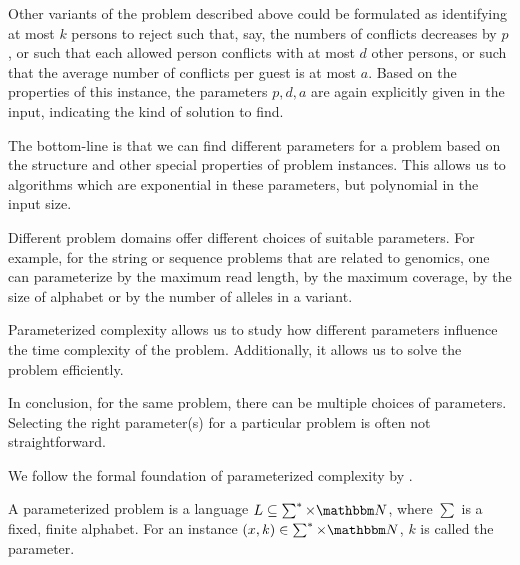 Other variants of the problem described above could be formulated as identifying at most $k$ persons to reject such that,
say, the numbers of conflicts decreases by $p$, or such that each allowed person conflicts with at most $d$ other persons,
or such that the average number of conflicts per guest is at most $a$. Based on the properties of this instance, the parameters $p, d, a$ are again explicitly given in the input,
indicating the kind of solution to find. 

The bottom-line is that we can find different parameters for a problem based on the structure and other special properties of problem instances.
This allows us to algorithms which are exponential in these parameters, but polynomial in the input size.

Different problem domains offer different choices of suitable parameters. For example, 
for the string or sequence problems that are related to genomics, one can parameterize by the maximum read length, by the maximum coverage,
by the size of alphabet or by the number of alleles in a variant.

Parameterized complexity allows us to study how different parameters influence the time complexity of the problem.
Additionally, it allows us to solve the problem efficiently.

In conclusion, for the same problem, there can be multiple choices of parameters. 
Selecting the right parameter(s) for a particular problem is often not straightforward.

We follow the formal foundation of parameterized complexity by \cite{cygan2015parameterized}.

\begin{definition}
 A parameterized problem is a language $L \subseteq \sum^* \times \N$, where $\sum$ is a fixed, finite alphabet. For an instance $(x,k) \in \sum^* \times \N$, $k$ is called the parameter.
\end{definition}



